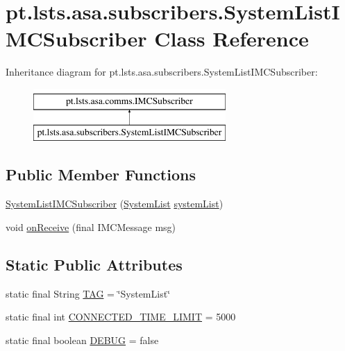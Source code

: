 \hypertarget{classpt_1_1lsts_1_1asa_1_1subscribers_1_1SystemListIMCSubscriber}{}\section{pt.\+lsts.\+asa.\+subscribers.\+System\+List\+I\+M\+C\+Subscriber Class Reference}
\label{classpt_1_1lsts_1_1asa_1_1subscribers_1_1SystemListIMCSubscriber}
Inheritance diagram for pt.\+lsts.\+asa.\+subscribers.\+System\+List\+I\+M\+C\+Subscriber\+:\begin{figure}[H]
\begin{center}
\leavevmode
\includegraphics[height=2.000000cm]{classpt_1_1lsts_1_1asa_1_1subscribers_1_1SystemListIMCSubscriber}
\end{center}
\end{figure}
\subsection*{Public Member Functions}
\begin{DoxyCompactItemize}
\item 
\hyperlink{classpt_1_1lsts_1_1asa_1_1subscribers_1_1SystemListIMCSubscriber_abfc2cf1f2a071f756c7af960e00fc5d6}{System\+List\+I\+M\+C\+Subscriber} (\hyperlink{classpt_1_1lsts_1_1asa_1_1sys_1_1SystemList}{System\+List} \hyperlink{classpt_1_1lsts_1_1asa_1_1subscribers_1_1SystemListIMCSubscriber_a8f2e523c325d1b02c42aebc7a778fd73}{system\+List})
\item 
void \hyperlink{classpt_1_1lsts_1_1asa_1_1subscribers_1_1SystemListIMCSubscriber_ab211db95a93daec850348ecf8bffe5fb}{on\+Receive} (final I\+M\+C\+Message msg)
\end{DoxyCompactItemize}
\subsection*{Static Public Attributes}
\begin{DoxyCompactItemize}
\item 
static final String \hyperlink{classpt_1_1lsts_1_1asa_1_1subscribers_1_1SystemListIMCSubscriber_a0f2b35c5f24bfea6e732312db320590a}{T\+A\+G} = \char`\"{}System\+List\char`\"{}
\item 
static final int \hyperlink{classpt_1_1lsts_1_1asa_1_1subscribers_1_1SystemListIMCSubscriber_aec1152e9d16d24dcfe74ce7ea8cbc5aa}{C\+O\+N\+N\+E\+C\+T\+E\+D\+\_\+\+T\+I\+M\+E\+\_\+\+L\+I\+M\+I\+T} = 5000
\item 
static final boolean \hyperlink{classpt_1_1lsts_1_1asa_1_1subscribers_1_1SystemListIMCSubscriber_afac8a6f4363e99128d3aefcddf29ca34}{D\+E\+B\+U\+G} = false
\end{DoxyCompactItemize}
